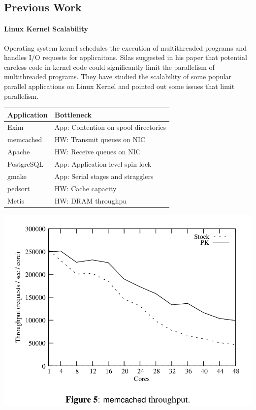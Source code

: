\subsection{Previous Work}

\paragraph{Linux Kernel Scalability} Operating system kernel schedules the
execution of multithreaded programs and handles I/O requests for 
applicaitons. Silas\cite{rel:silas} suggested in his paper that potential
careless code in kernel code could significantly limit the parallelism of 
multithreaded programs. They have studied the scalability of some popular 
parallel applications on Linux Kernel and pointed out some issues that 
limit parallelism.
\begin{center}
\begin{tabular}[t] {l|l} 
Application & Bottleneck \\
\hline
Exim &App: Contention on spool directories \\
memcached &HW: Transmit queues on NIC \\
Apache &HW: Receive queues on NIC \\
PostgreSQL &App: Application-level spin lock \\
gmake &App: Serial stages and stragglers \\
pedsort &HW: Cache capacity \\
Metis &HW: DRAM throughpu 
\end{tabular}
\includegraphics[width=0.8\linewidth]{figures/memcachced_scal.png}
\end{center}

%
